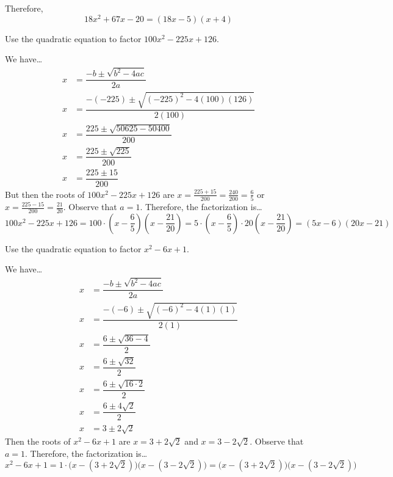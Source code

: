 \documentclass[11pt,letterpaper]{article}
\begin{document}
Therefore, 
	\[
	18x^2 + 67x - 20= (18x - 5)(x + 4)
	\]



\newpage



 Use the quadratic equation to factor $100x^2 - 225x + 126$. \pspace

\sol We have\dots \pspace
	\[
	\begin{aligned}
	x&= \dfrac{-b \pm \sqrt{b^2 - 4ac}}{2a} \\[0.3cm]
	x&= \dfrac{-(-225) \pm \sqrt{(-225)^2 - 4(100)(126)}}{2(100)} \\[0.3cm]
	x&= \dfrac{225 \pm \sqrt{50625 - 50400}}{200} \\[0.3cm]
	x&= \dfrac{225 \pm \sqrt{225}}{200} \\[0.3cm]
	x&= \dfrac{225 \pm 15}{200}
	\end{aligned}
	\] \pspace
But then the roots of $100x^2 - 225x + 126$ are $x= \frac{225 + 15}{200}= \frac{240}{200}= \frac{6}{5}$ or $x= \frac{225 - 15}{200}= \frac{21}{20}$. Observe that $a= 1$. Therefore, the factorization is\dots
	\[
	100x^2 - 225x + 126= 100 \cdot \left(x - \dfrac{6}{5} \right) \left(x - \dfrac{21}{20} \right)= 5 \cdot \left(x - \dfrac{6}{5} \right) \cdot 20\left(x - \dfrac{21}{20} \right)= (5x - 6)(20x - 21)
	\]



\newpage



 Use the quadratic equation to factor $x^2 - 6x + 1$. \pspace

\sol We have\dots \pspace
	\[
	\begin{aligned}
	x&= \dfrac{-b \pm \sqrt{b^2 - 4ac}}{2a} \\[0.3cm]
	x&= \dfrac{-(-6) \pm \sqrt{(-6)^2 - 4(1)(1)}}{2(1)} \\[0.3cm]
	x&= \dfrac{6 \pm \sqrt{36 - 4}}{2} \\[0.3cm]
	x&= \dfrac{6 \pm \sqrt{32}}{2} \\[0.3cm]
	x&= \dfrac{6 \pm \sqrt{16 \cdot 2}}{2} \\[0.3cm]
	x&= \dfrac{6 \pm 4\sqrt{2}}{2} \\[0.3cm]
	x&= 3 \pm 2 \sqrt{2}
	\end{aligned}
	\] \pspace
Then the roots of $x^2 - 6x + 1$ are $x= 3 + 2\sqrt{2}$ and $x= 3 - 2\sqrt{2}$. Observe that $a= 1$. Therefore, the factorization is\dots \pspace
	\[
	x^2 - 6x + 1= 1 \cdot \big(x - (3 + 2\sqrt{2}) \big) \big(x - (3 - 2\sqrt{2}) \big)= \big(x - (3 + 2\sqrt{2}) \big) \big(x - (3 - 2\sqrt{2}) \big)
	\]
\end{document}
